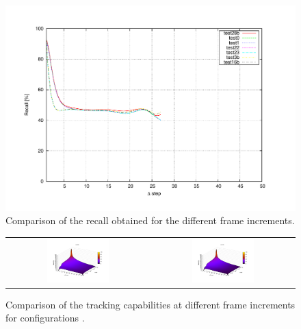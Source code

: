 \begin{figure}[h!]
\centering
\includegraphics[trim=50 40 80 60,clip]{increments}
\caption{Comparison of the recall obtained for the different frame increments.}\label{fig:cp04_increments}
\end{figure}

\begin{figure}[h!]
\begin{tabular}{cc}
\includegraphics[width=0.45\textwidth,trim=50 40 80 60,clip]{recall_vs_delta_frames_vs_step_test28b}\label{fig:cp04_recall_vs_delta_frames_vs_step_test28b} &
\includegraphics[width=0.45\textwidth,trim=50 40 80 60,clip]{recall_vs_delta_frames_vs_step_test16b}\label{fig:cp04_recall_vs_delta_frames_vs_step_test16b}
\end{tabular}
\caption{Comparison of the tracking capabilities at different frame increments for configurations .}\label{fig:cp04_recall_vs_delta_frames_vs_step}
\end{figure}

